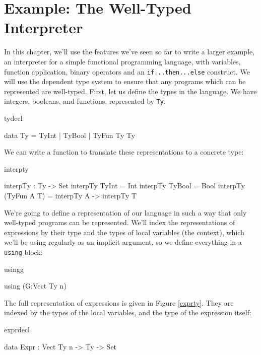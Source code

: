 \section{Example: The Well-Typed Interpreter}

In this chapter, we'll use the features we've seen so far to write a larger
example, an interpreter for a simple functional programming language, with
variables, function application, binary operators and an \texttt{if...then...else}
construct. We will use the dependent type system to ensure that any programs
which can be represented are well-typed. First, let us define the types in the
language. We have integers, booleans, and functions, represented by \texttt{Ty}:

\begin{SaveVerbatim}{tydecl}

data Ty = TyInt | TyBool | TyFun Ty Ty

\end{SaveVerbatim}

\noindent
We can write a function to translate these representations to a concrete \Idris{}
type:

\begin{SaveVerbatim}{interpty}

interpTy : Ty -> Set
interpTy TyInt = Int
interpTy TyBool = Bool
interpTy (TyFun A T) = interpTy A -> interpTy T

\end{SaveVerbatim}

\noindent
We're going to define a representation of our language in such a way that only
well-typed programs can be represented. We'll index the representations of
expressions by their type and the types of local variables (the context), which
we'll be using regularly as an implicit argument, so we define everything
in a \texttt{using} block:

\begin{SaveVerbatim}{usingg}

using (G:Vect Ty n)

\end{SaveVerbatim}

\noindent
The full representation of expressions is given in Figure \ref{exprty}. They are
indexed by the types of the local variables, and the type of the expression itself:

\begin{SaveVerbatim}{exprdecl}

data Expr : Vect Ty n -> Ty -> Set

\end{SaveVerbatim}

